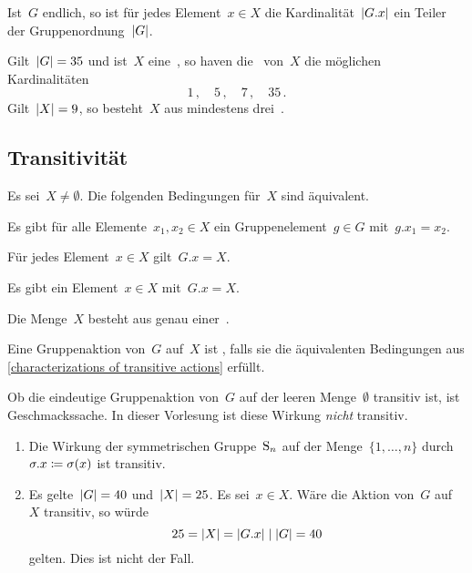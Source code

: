 \begin{corollary}
  Ist~$G$ endlich, so ist für jedes Element~$x \in X$ die Kardinalität~$\lvert G.x\rvert$ ein Teiler der Gruppenordnung~$\lvert G\rvert$.
\end{corollary}


\begin{example}
  Gilt~$\lvert G\rvert = 35$ und ist~$X$ eine~, so haven die~ von~$X$ die möglichen Kardinalitäten
  \[
    1 \,,
    \quad
    5 \,,
    \quad
    7 \,,
    \quad
    35 \,.
  \]
  Gilt~$\lvert X\rvert = 9$, so besteht~$X$ aus mindestens drei~.
\end{example}


\subsection{Transitivität}

\begin{proposition}
  \label{characterizations of transitive actions}
  Es sei~$X \neq \emptyset$.
  Die folgenden Bedingungen für~$X$ sind äquivalent.
  \begin{equivlist}
    \item
      Es gibt für alle Elemente~$x_1, x_2 \in X$ ein Gruppenelement~$g \in G$ mit~$g.x_1 = x_2$.
    \item
      Für jedes Element~$x \in X$ gilt~$G.x = X$.
    \item
      Es gibt ein Element~$x \in X$ mit~$G.x = X$.
    \item
      Die Menge~$X$ besteht aus genau einer~.
  \end{equivlist}
\end{proposition}

\begin{definition}
  Eine Gruppenaktion von~$G$ auf~$X$ ist , falls sie die äquivalenten Bedingungen aus \cref{characterizations of transitive actions} erfüllt.
\end{definition}

\begin{warning}
  Ob die eindeutige Gruppenaktion von~$G$ auf der leeren Menge~$\emptyset$ transitiv ist, ist Geschmackssache.
  In dieser Vorlesung ist diese Wirkung \emph{nicht} transitiv.
\end{warning}

\begin{example}
  \leavevmode
  \begin{enumerate}
    \item
      Die Wirkung der symmetrischen Gruppe~$\operatorname{S}_n$ auf der Menge~$\{1, \dotsc, n\}$ durch~$\sigma.x \coloneqq \sigma(x)$ ist transitiv.
    \item
      Es gelte~$\lvert G\rvert = 40$ und~$\lvert X\rvert = 25$.
      Es sei~$x \in X$.
      Wäre die Aktion von~$G$ auf~$X$ transitiv, so würde
      \[
        25
        =
        \lvert X\rvert
        =
        \lvert G.x\rvert
        \mid
        \lvert G\rvert
        =
        40
      \]
      gelten.
      Dies ist nicht der Fall.
  \end{enumerate}
\end{example}



